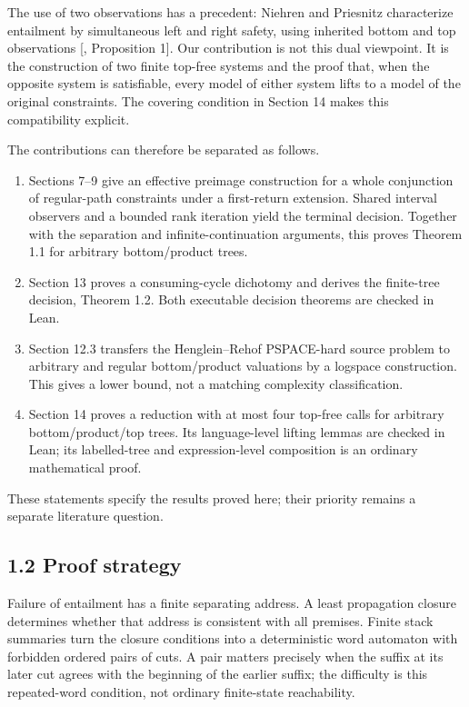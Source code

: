 \documentclass[
  11pt,
  a4paper,
]{article}
\providecommand{\tightlist}{%
  \setlength{\itemsep}{0pt}\setlength{\parskip}{0pt}}
\begin{document}
The use of two observations has a precedent: Niehren and Priesnitz
characterize entailment by simultaneous left and right safety, using
inherited bottom and top observations {[},
Proposition 1{]}. Our contribution is not this dual viewpoint. It is the
construction of two finite top-free systems and the proof that, when the
opposite system is satisfiable, every model of either system lifts to a
model of the original constraints. The covering condition in Section 14
makes this compatibility explicit.

The contributions can therefore be separated as follows.

\begin{enumerate}
\def\labelenumi{\arabic{enumi}.}
\tightlist
\item
  Sections 7--9 give an effective preimage construction for a whole
  conjunction of regular-path constraints under a first-return
  extension. Shared interval observers and a bounded rank iteration
  yield the terminal decision. Together with the separation and
  infinite-continuation arguments, this proves Theorem 1.1 for arbitrary
  bottom/product trees.
\item
  Section 13 proves a consuming-cycle dichotomy and derives the
  finite-tree decision, Theorem 1.2. Both executable decision theorems
  are checked in Lean.
\item
  Section 12.3 transfers the Henglein--Rehof PSPACE-hard source problem
  to arbitrary and regular bottom/product valuations by a logspace
  construction. This gives a lower bound, not a matching complexity
  classification.
\item
  Section 14 proves a reduction with at most four top-free calls for
  arbitrary bottom/product/top trees. Its language-level lifting lemmas
  are checked in Lean; its labelled-tree and expression-level
  composition is an ordinary mathematical proof.
\end{enumerate}

These statements specify the results proved here; their priority remains
a separate literature question.

\subsection{1.2 Proof strategy}\label{proof-strategy}

Failure of entailment has a finite separating address. A least
propagation closure determines whether that address is consistent with
all premises. Finite stack summaries turn the closure conditions into a
deterministic word automaton with forbidden ordered pairs of cuts. A
pair matters precisely when the suffix at its later cut agrees with the
beginning of the earlier suffix; the difficulty is this repeated-word
condition, not ordinary finite-state reachability.
\end{document}
